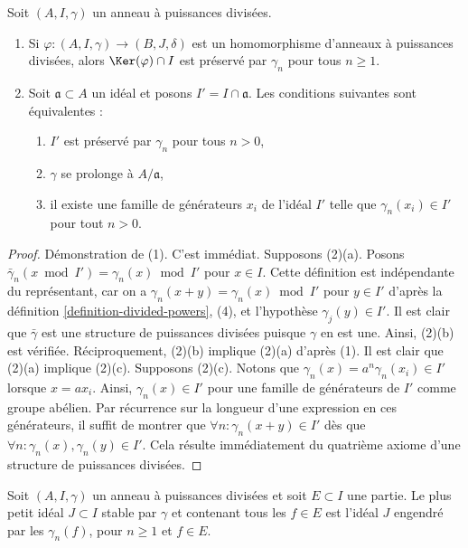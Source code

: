 \begin{lemma}
\label{lemma-kernel}
Soit $(A, I, \gamma)$ un anneau à puissances divisées.
\begin{enumerate}
\item Si $\varphi : (A, I, \gamma) \to (B, J, \delta)$ est
un homomorphisme d'anneaux à puissances divisées, alors $\Ker(\varphi) \cap I$
est préservé par $\gamma_n$ pour tous $n \geq 1$.
\item Soit $\mathfrak a \subset A$ un idéal et posons
$I' = I \cap\mathfrak a$. Les conditions suivantes sont équivalentes :
\begin{enumerate}
\item $I'$ est préservé par $\gamma_n$ pour tous $n > 0$,
\item $\gamma$ se prolonge à $A/\mathfrak a$,
\item il existe une famille de générateurs $x_i$ de l'idéal $I'$ telle
que $\gamma_n(x_i) \in I'$ pour tout $n > 0$.
\end{enumerate}
\end{enumerate}
\end{lemma}

\begin{proof}
Démonstration de (1). C'est immédiat. Supposons (2)(a). Posons
$\bar\gamma_n(x \bmod I') = \gamma_n(x) \bmod I'$ pour $x \in I$.
Cette définition est indépendante du représentant, car on a $\gamma_n(x + y) = \gamma_n(x) \bmod I'$
pour $y \in I'$ d'après la définition \ref{definition-divided-powers}, (4),
et l'hypothèse $\gamma_j(y) \in I'$. Il est clair que
$\bar\gamma$ est une structure de puissances divisées puisque $\gamma$ en est
une. Ainsi, (2)(b) est vérifiée. Réciproquement, (2)(b) implique (2)(a)
d'après (1). Il est clair que (2)(a) implique (2)(c). Supposons (2)(c).
Notons que $\gamma_n(x) = a^n\gamma_n(x_i) \in I'$ lorsque $x = ax_i$.
Ainsi, $\gamma_n(x) \in I'$ pour une famille de générateurs de $I'$
comme groupe abélien. Par récurrence sur la longueur d'une expression en
ces générateurs, il suffit de montrer que $\forall n : \gamma_n(x + y) \in I'$
dès que $\forall n : \gamma_n(x), \gamma_n(y) \in I'$. Cela
résulte immédiatement du quatrième axiome d'une structure de puissances divisées.
\end{proof}

\begin{lemma}
\label{lemma-sub-dp-ideal}
Soit $(A, I, \gamma)$ un anneau à puissances divisées et
soit $E \subset I$ une
partie. Le plus petit idéal $J \subset I$ stable par $\gamma$
et contenant tous les $f \in E$ est l'idéal $J$ engendré par les
$\gamma_n(f)$, pour $n \geq 1$ et $f \in E$.
\end{lemma}

